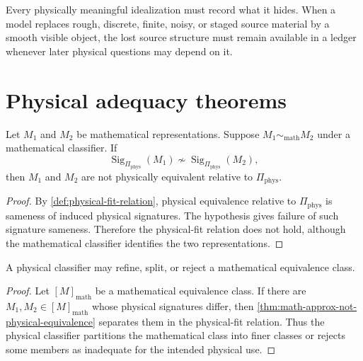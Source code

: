 \begin{principle}
\label{prin:compression-requires-physical-memory}
Every physically meaningful idealization must record what it hides. When a model replaces rough, discrete, finite, noisy, or staged source material by a smooth visible object, the lost source structure must remain available in a ledger whenever later physical questions may depend on it.
\end{principle}

\section{Physical adequacy theorems}
\label{sec:physical-adequacy-theorems}

\begin{theorem}
\label{thm:math-approx-not-physical-equivalence}
Let $M_1$ and $M_2$ be mathematical representations. Suppose $M_1\sim_{\mathrm{math}}M_2$ under a mathematical classifier. If
$$
\operatorname{Sig}_{\Pi_{\mathrm{phys}}}(M_1)
\not\sim
\operatorname{Sig}_{\Pi_{\mathrm{phys}}}(M_2),
$$
then $M_1$ and $M_2$ are not physically equivalent relative to $\Pi_{\mathrm{phys}}$.
\end{theorem}

\begin{proof}
By \autoref{def:physical-fit-relation}, physical equivalence relative to $\Pi_{\mathrm{phys}}$ is sameness of induced physical signatures. The hypothesis gives failure of such signature sameness. Therefore the physical-fit relation does not hold, although the mathematical classifier identifies the two representations.
\end{proof}

\begin{corollary}
\label{cor:physics-refines-mathematical-equivalence}
A physical classifier may refine, split, or reject a mathematical equivalence class.
\end{corollary}

\begin{proof}
Let $[M]_{\mathrm{math}}$ be a mathematical equivalence class. If there are $M_1,M_2\in[M]_{\mathrm{math}}$ whose physical signatures differ, then \autoref{thm:math-approx-not-physical-equivalence} separates them in the physical-fit relation. Thus the physical classifier partitions the mathematical class into finer classes or rejects some members as inadequate for the intended physical use.
\end{proof}

